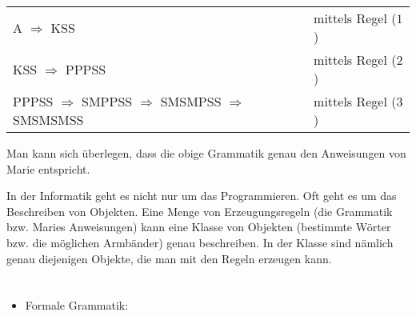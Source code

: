{{\begin{adjustwidth}{1.5em}{0em}
\begin{tabular}{ @{} l l @{} }
  A \ensuremath{\Rightarrow} KSS & mittels Regel ($1$) \\ 
  KSS \ensuremath{\Rightarrow} PPPSS & mittels Regel ($2$) \\ 
  PPPSS \ensuremath{\Rightarrow} SMPPSS \ensuremath{\Rightarrow} SMSMPSS \ensuremath{\Rightarrow} SMSMSMSS & mittels Regel ($3$)
\end{tabular}


\end{adjustwidth}

Man kann sich überlegen, dass die obige Grammatik genau den Anweisungen von Marie entspricht.

In der Informatik geht es nicht nur um das Programmieren. Oft geht es um das Beschreiben von Objekten. Eine Menge von Erzeugungsregeln (die Grammatik bzw. Maries Anweisungen) kann eine Klasse von Objekten (bestimmte Wörter bzw. die möglichen Armbänder) genau beschreiben. In der Klasse sind nämlich genau diejenigen Objekte, die man mit den Regeln erzeugen kann.



\section*{\BrochureWebsitesAndKeywords}
{\raggedright
\begin{itemize}
  \item Formale Grammatik: \href{https://de.wikipedia.org/wiki/Formale_Grammatik}{}
\end{itemize}


}

}{}

\def\AuthorCoolsaetK{} %
\def\AuthorJovanovM{} %
\def\AuthorStankovE{} %
\def\AuthorRossmanithP{} %
\def\AuthorDatzkoS{} %
\def\AuthorFreiF{} %
\def\AuthorHromkovicJ{} %

\newpage}{}
